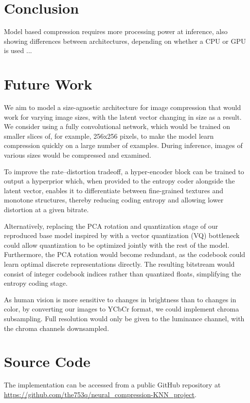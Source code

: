 \documentclass[conference]{IEEEtran}
\begin{document}
\section{Conclusion}
Model based compression requires more processing power at inference, also showing differences between architectures, depending on whether a CPU or GPU is used \cite{cheng_deep_2018}... 


\section{Future Work}
We aim to model a size-agnostic architecture for image compression that would work for varying image sizes, with the latent vector changing in size as a result. We consider using a fully convolutional network, which would be trained on smaller slices of, for example, 256x256 pixels, to make the model learn compression quickly on a large number of examples. During inference, images of various sizes would be compressed and examined.

To improve the rate–distortion tradeoff, a hyper-encoder block can be trained to output a hyperprior which, when provided to the entropy coder alongside the latent vector, enables it to differentiate between fine-grained textures and monotone structures, thereby reducing coding entropy and allowing lower distortion at a given bitrate.

Alternatively, replacing the PCA rotation and quantization stage of our reproduced base model inspired by \cite{cheng_deep_2018} with a vector quantization (VQ) bottleneck \cite{oord_neural_2018} could allow quantization to be optimized jointly with the rest of the model. Furthermore, the PCA rotation would become redundant, as the codebook could learn optimal discrete representations directly. The resulting bitstream would consist of integer codebook indices rather than quantized floats, simplifying the entropy coding stage.

As human vision is more sensitive to changes in brightness than to changes in color, by converting our images to YCbCr format, we could implement chroma subsampling. Full resolution would only be given to the luminance channel, with the chroma channels downsampled.



\section*{Source Code}
The implementation can be accessed from a public GitHub repository at 
\url{https://github.com/the753q/neural_compression-KNN_project}.


\twocolumn[
\begin{@twocolumnfalse}
    
    
\end{@twocolumnfalse}
]
\end{document}
